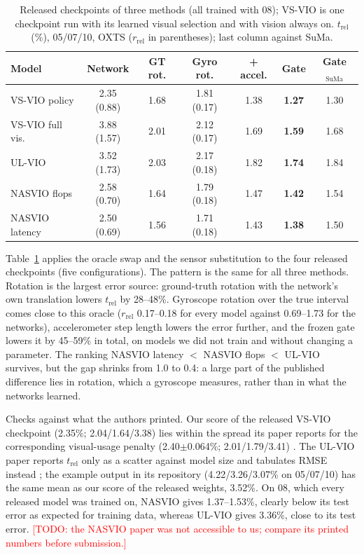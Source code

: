 \documentclass[letterpaper,journal]{IEEEtran}
\newcommand{\trel}{t_{\mathrm{rel}}}
\newcommand{\rrel}{r_{\mathrm{rel}}}
\newcommand{\todo}[1]{\textcolor{red}{[TODO: #1]}}
\begin{document}
\begin{table}[t]
\centering
\caption{Released checkpoints of three methods (all trained with 08); VS-VIO is one checkpoint run with its learned visual selection and with vision always on. $\trel$ (\%), 05/07/10, OXTS ($\rrel$ in parentheses); last column against SuMa.}
\label{tab:diag}
\setlength{\tabcolsep}{2pt}
\begin{tabular}{@{}lcccccc@{}}
\toprule
Model & Network & GT rot. & Gyro rot. & + accel. & Gate & Gate$_\mathrm{SuMa}$ \\
\midrule
VS-VIO policy & 2.35 (0.88) & 1.68 & 1.81 (0.17) & 1.38 & \textbf{1.27} & 1.30 \\
VS-VIO full vis. & 3.88 (1.57) & 2.01 & 2.12 (0.17) & 1.69 & \textbf{1.59} & 1.68 \\
UL-VIO & 3.52 (1.73) & 2.03 & 2.17 (0.18) & 1.82 & \textbf{1.74} & 1.84 \\
NASVIO flops & 2.58 (0.70) & 1.64 & 1.79 (0.18) & 1.47 & \textbf{1.42} & 1.54 \\
NASVIO latency & 2.50 (0.69) & 1.56 & 1.71 (0.18) & 1.43 & \textbf{1.38} & 1.50 \\
\bottomrule
\end{tabular}
\end{table}

Table~\ref{tab:diag} applies the oracle swap and the sensor substitution to the four released checkpoints (five configurations). The pattern is the same for all three methods. Rotation is the largest error source: ground-truth rotation with the network's own translation lowers $\trel$ by 28--48\%. Gyroscope rotation over the true interval comes close to this oracle ($\rrel$ 0.17--0.18 for every model against 0.69--1.73 for the networks), accelerometer step length lowers the error further, and the frozen gate lowers it by 45--59\% in total, on models we did not train and without changing a parameter. The ranking NASVIO latency $<$ NASVIO flops $<$ UL-VIO survives, but the gap shrinks from 1.0 to 0.4: a large part of the published difference lies in rotation, which a gyroscope measures, rather than in what the networks learned.

Checks against what the authors printed. Our score of the released VS-VIO checkpoint (2.35\%; 2.04/1.64/3.38) lies within the spread its paper reports for the corresponding visual-usage penalty (2.40$\pm$0.064\%; 2.01/1.79/3.41) \cite{Yang2022}. The UL-VIO paper reports $\trel$ only as a scatter against model size and tabulates RMSE instead \cite{Park2024ULVIO}; the example output in its repository (4.22/3.26/3.07\% on 05/07/10) has the same mean as our score of the released weights, 3.52\%. On 08, which every released model was trained on, NASVIO gives 1.37--1.53\%, clearly below its test error as expected for training data, whereas UL-VIO gives 3.36\%, close to its test error. \todo{the NASVIO paper \cite{Chen2023NASVIO} was not accessible to us; compare its printed numbers before submission.}
\end{document}
